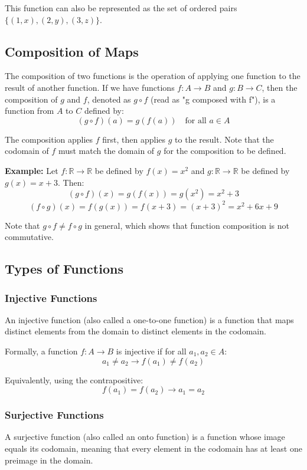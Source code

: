 This function can also be represented as the set of ordered pairs \(\{(1,x), (2,y), (3,z)\}\).

\subsection{Composition of Maps}
The composition of two functions is the operation of applying one function to the result of another function. If we have functions \(f: A \to B\) and \(g: B \rightarrow C\), then the composition of \(g\) and \(f\), denoted as \(g \circ f\) (read as "g composed with f"), is a function from \(A\) to \(C\) defined by:
\[
	(g \circ f)(a) = g(f(a)) \quad \text{for all } a \in A
\]

The composition applies \(f\) first, then applies \(g\) to the result. Note that the codomain of \(f\) must match the domain of \(g\) for the composition to be defined.

\textbf{Example:} Let \(f: \mathbb{R} \to \mathbb{R}\) be defined by \(f(x) = x^2\) and \(g: \mathbb{R} \rightarrow \mathbb{R}\) be defined by \(g(x) = x+3\). Then:
\[
	(g \circ f)(x) = g(f(x)) = g(x^2) = x^2 + 3
\]
\[
	(f \circ g)(x) = f(g(x)) = f(x+3) = (x+3)^2 = x^2 + 6x + 9
\]

Note that \(g \circ f \neq f \circ g\) in general, which shows that function composition is not commutative.

\subsection{Types of Functions}

\subsubsection{Injective Functions}
An injective function (also called a one-to-one function) is a function that maps distinct elements from the domain to distinct elements in the codomain.

Formally, a function \(f: A \to B\) is injective if for all \(a_1, a_2 \in A\):
\[
	a_1 \neq a_2 \to f(a_1) \neq f(a_2)
\]

Equivalently, using the contrapositive:
\[
	f(a_1) = f(a_2) \to a_1 = a_2
\]

\subsubsection{Surjective Functions}
A surjective function (also called an onto function) is a function whose image equals its codomain, meaning that every element in the codomain has at least one preimage in the domain.

